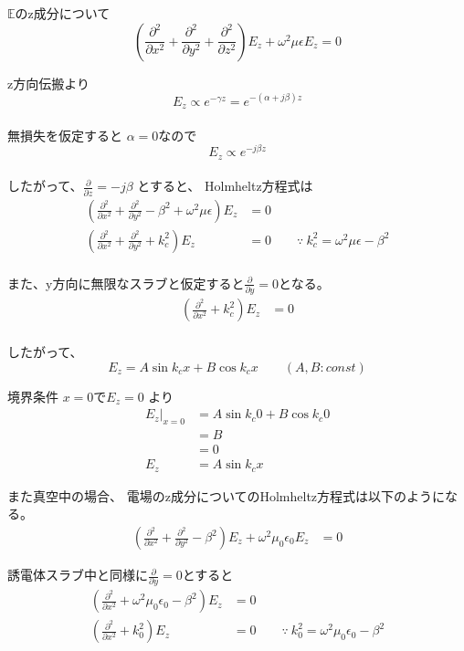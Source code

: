 \documentclass[a4paper,10pt]{bxjsarticle}
\begin{document}
$\mathbb{E}$のz成分について
$$
\left( 
    \frac{\partial^2}{\partial x^2} 
    + \frac{\partial^2}{\partial y^2} 
    + \frac{\partial^2}{\partial z^2} 
\right) E_z
+ \omega^2 \mu \epsilon E_z
= 0
$$

z方向伝搬より $$E_z \propto e^{-\gamma z} = e^{-(\alpha + j \beta)z}$$ \\
無損失を仮定すると $\alpha = 0$なので $$E_z \propto e^{ -j \beta z}$$ \\
したがって、$ \frac{\partial}{\partial z} = -j \beta $ とすると、
Holmheltz方程式は
\begin{align*} 
\left( 
    \frac{\partial^2}{\partial x^2} 
    + \frac{\partial^2}{\partial y^2} 
    - \beta^2 
    + \omega^2 \mu \epsilon
\right) E_z
&= 0 \\
\left( 
    \frac{\partial^2}{\partial x^2} 
    + \frac{\partial^2}{\partial y^2} 
    + k_c^2
\right) E_z
&= 0 \qquad
\because \ k_c^2 = \omega^2 \mu \epsilon - \beta^2 \\
\end{align*}

また、y方向に無限なスラブと仮定すると$\frac{\partial}{\partial y} = 0$となる。
\begin{align*} 
    \left( 
        \frac{\partial^2}{\partial x^2} + k_c^2
    \right) E_z
    &= 0 \\
\end{align*}

したがって、
$$ E_z = A \sin k_c x + B \cos k_c x \qquad (A,B : const) $$

境界条件 $x = 0$で$E_z = 0$ より
\begin{align*}
    E_z|_{x=0} &= A \sin k_c 0 + B \cos k_c 0 \\
             &= B \\ 
             &= 0 \\
    E_z &= A \sin k_c x
\end{align*}

また真空中の場合、
電場のz成分についてのHolmheltz方程式は以下のようになる。
\begin{align*}
    \left( 
        \frac{\partial^2}{\partial x^2} 
        + \frac{\partial^2}{\partial y^2} 
        - \beta^2
    \right) E_z
    + \omega^2 \mu_0 \epsilon_0 E_z
    & = 0
\end{align*}

誘電体スラブ中と同様に$\frac{\partial}{\partial y} = 0$とすると
\begin{align*}
    \left( 
        \frac{\partial^2}{\partial x^2} 
        + \omega^2 \mu_0 \epsilon_0 - \beta^2 
    \right) E_z
    & = 0 \\
    \left( 
        \frac{\partial^2}{\partial x^2} 
        + k_0^2
    \right) E_z
    & = 0 \qquad
    \because \ k_0^2 = \omega^2 \mu_0 \epsilon_0 - \beta^2 \\
\end{align*}
\end{document}
